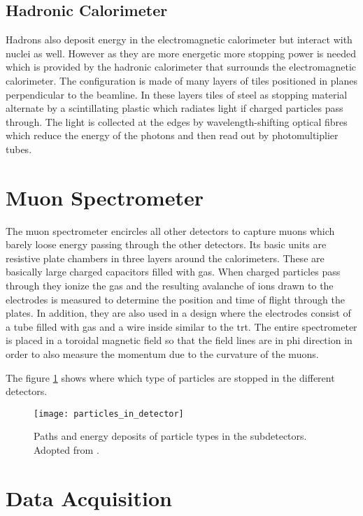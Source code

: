 \subsection*{Hadronic Calorimeter}

Hadrons also deposit energy in the electromagnetic calorimeter but interact with nuclei as well. However as they are more energetic more stopping power is needed which is provided by the hadronic calorimeter that surrounds the electromagnetic calorimeter. The configuration is made of many layers of tiles positioned in planes perpendicular to the beamline. In these layers tiles of steel as stopping material alternate by a scintillating plastic which radiates light if charged particles pass through. The light is collected at the edges by wavelength-shifting optical fibres  which reduce the energy of the photons and then read out by photomultiplier tubes.

\section{Muon Spectrometer}

The muon spectrometer encircles all other detectors to capture muons which barely loose energy passing through the other detectors. Its basic units are resistive plate chambers in three layers around the calorimeters. These are basically large charged capacitors filled with gas. When charged particles pass through they ionize the gas and the resulting avalanche of ions drawn to the electrodes is measured to determine the position and time of flight through the plates.  In addition, they are also used in a design where the electrodes consist of a tube filled with gas and a wire inside similar to the \ac{trt}. The entire spectrometer is placed in a toroidal magnetic field so that the field lines are in phi direction in order to also measure the momentum due to the curvature of the muons.

The figure \ref{fig:particles_in_detector} shows where which type of particles are stopped in the different detectors.
\begin{figure}
    \centering
    \texttt{[image: particles\_in\_detector]}
        \caption[]{Paths and energy deposits of particle types in the subdetectors. Adopted from \citep{Pequenao:1505342}.}
    \label{fig:particles_in_detector}    
\end{figure}

\section{Data Acquisition}
